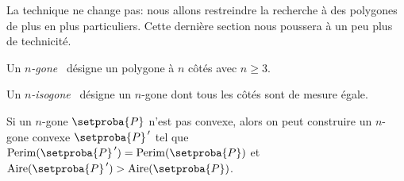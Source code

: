 La technique ne change pas: nous allons restreindre la recherche à des polygones de plus en plus particuliers. Cette dernière section nous poussera à un peu plus de technicité.




\begin{defi}
	Un \og \emph{$n$-gone} \fg\ désigne un polygone à $n$ côtés avec $n \geq 3$.
\end{defi}


\begin{defi}
	Un \og \emph{$n$-isogone} \fg\ désigne un $n$-gone dont tous les côtés sont de mesure égale.
\end{defi}




\begin{fact} \label{conv-poly}
	Si un $n$-gone $\setproba{P}$ n'est pas convexe, alors on peut construire un $n$-gone convexe $\setproba{P}^{\,\prime}$ tel que 
	$\perim{\setproba{P}^{\,\prime}} = \perim{\setproba{P}}$ 
	et 
	$\area{\setproba{P}^{\,\prime}} > \area{\setproba{P}}$.
\end{fact}


